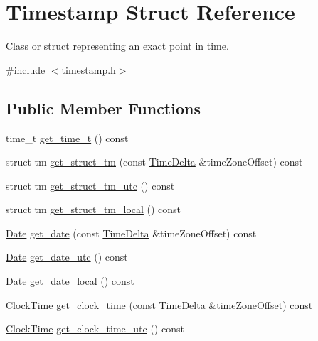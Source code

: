 \hypertarget{structTimestamp}{\section{\-Timestamp \-Struct \-Reference}
\label{structTimestamp}
}


\-Class or struct representing an exact point in time.  




{\ttfamily \#include $<$timestamp.\-h$>$}

\subsection*{\-Public \-Member \-Functions}
\begin{DoxyCompactItemize}
\item 
time\-\_\-t \hyperlink{structTimestamp_a54782bcc812fdeea952ec0e0880aac5f}{get\-\_\-time\-\_\-t} () const 
\item 
struct tm \hyperlink{structTimestamp_ad75f04af1d0b038a2d43b117f72dee65}{get\-\_\-struct\-\_\-tm} (const \hyperlink{structTimeDelta}{\-Time\-Delta} \&time\-Zone\-Offset) const 
\item 
struct tm \hyperlink{structTimestamp_a763f8ab757e5d6cfb45c7931f75c5654}{get\-\_\-struct\-\_\-tm\-\_\-utc} () const 
\item 
struct tm \hyperlink{structTimestamp_abc2107430b61e373e5ff84d16c1a097a}{get\-\_\-struct\-\_\-tm\-\_\-local} () const 
\item 
\hyperlink{structDate}{\-Date} \hyperlink{structTimestamp_a07b4b2e5d95a2b23fe48c9682435c727}{get\-\_\-date} (const \hyperlink{structTimeDelta}{\-Time\-Delta} \&time\-Zone\-Offset) const 
\item 
\hyperlink{structDate}{\-Date} \hyperlink{structTimestamp_a4dd9ee5c1ceaad6d4f497487a3e666f5}{get\-\_\-date\-\_\-utc} () const 
\item 
\hyperlink{structDate}{\-Date} \hyperlink{structTimestamp_a77a1ae0ca0b09af2adc5f7f49b6c6618}{get\-\_\-date\-\_\-local} () const 
\item 
\hyperlink{structClockTime}{\-Clock\-Time} \hyperlink{structTimestamp_a8e4b0ee005f58cb645d945eaccd1bc9e}{get\-\_\-clock\-\_\-time} (const \hyperlink{structTimeDelta}{\-Time\-Delta} \&time\-Zone\-Offset) const 
\item 
\hyperlink{structClockTime}{\-Clock\-Time} \hyperlink{structTimestamp_a0767fd3f69eaa11bb094eb330d9c88ef}{get\-\_\-clock\-\_\-time\-\_\-utc} () const 
\item 

\end{DoxyCompactItemize}
